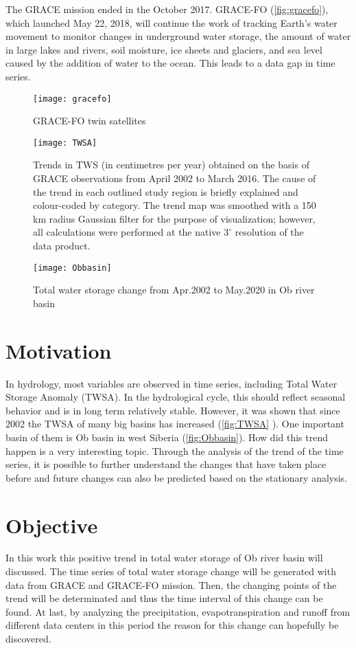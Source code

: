 The GRACE mission ended in the October 2017. GRACE-FO (\autoref{fig:gracefo}), which launched May 22, 2018, will continue the work of tracking Earth's water movement to monitor changes in underground water storage, the amount of water in large lakes and rivers, soil moisture, ice sheets and glaciers, and sea level caused by the addition of water to the ocean. This leads to a data gap in time series.
\begin{figure}[htbp]
	\centering
	\texttt{[image: gracefo]} %
	\caption{GRACE-FO twin satellites} 
	\label{fig:gracefo}
\end{figure}
\begin{figure}[htbp]
	\centering
	\texttt{[image: TWSA]} %
	\caption{Trends in TWS (in centimetres per year) obtained on the basis of GRACE observations from April 2002 to March 2016. The cause of the trend in each outlined study region is briefly explained and colour-coded by category. The trend map was smoothed with a 150 km radius Gaussian filter for the purpose of visualization; however, all calculations were performed at the native $3^{\circ}$ resolution of the data product.} 
	\label{fig:TWSA}
\end{figure}
\begin{figure}[ht]
	\centering
	\texttt{[image: Obbasin]} %
	\caption{Total water storage change from Apr.2002 to May.2020 in Ob river basin} 
	\label{fig:Obbasin}
\end{figure}
\section{Motivation}
In hydrology, most variables are observed in time series, including Total Water Storage Anomaly (TWSA). In the hydrological cycle, this should reflect seasonal behavior and is in long term relatively stable. However, it was shown that since 2002 the TWSA of many big basins has increased (\autoref{fig:TWSA} \cite{rodell2018emerging}). One important basin of them is Ob basin in west Siberia (\autoref{fig:Obbasin}). How did this trend happen is a very interesting topic. Through the analysis of the trend of the time series, it is possible to further understand the changes that have taken place before and future changes can also be predicted based on the stationary analysis.
\section{Objective}
In this work this positive trend in total water storage of Ob river basin will discussed. The time series of total water storage change will be generated with data from GRACE and GRACE-FO mission. Then, the changing points of the trend will be determinated and thus the time interval of this change can be found. At last, by analyzing the precipitation, evapotranspiration and runoff from different data centers in this period
 the reason for this change can hopefully be discovered. 

